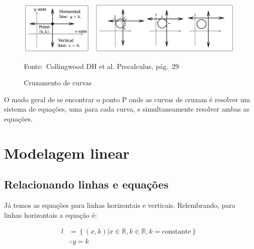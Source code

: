 \documentclass[pdftex, brazil, 12pt, twoside]{article}
\begin{document}
\begin{figure}[ht]
  \begin{center}
    \caption{Cruzamento de curvas}
    \label{fig:curvas-cruzamento-1}
    \includegraphics[scale=0.6]{imagens/cruzamento-curvas-1.png}
    
    \footnotesize{Fonte:~Collingwood DH et al. Precalculus, pág.\ 29}
  \end{center}
\end{figure}

O modo geral de se encontrar o ponto P onde as curvas de cruzam é resolver um
sistema de equações, uma para cada curva, e simultaneamente resolver ambas as
equações.


\section{Modelagem linear}
\label{modelagem-linear}

\subsection{Relacionando linhas e equações}
\label{modelagem-linear-relacionando-linhas}

Já temos as equações para linhas horizontais e verticais. Relembrando, para linhas horizontais
a equação é:

\begin{equation}
  \begin{split}
               l & = \left\{(x, k) | x \in \mathbb{R}, k \in \mathbb{R}, k = \text{constante}\right\}\\
                 & \therefore y = k
  \end{split}
\end{equation}
\end{document}
